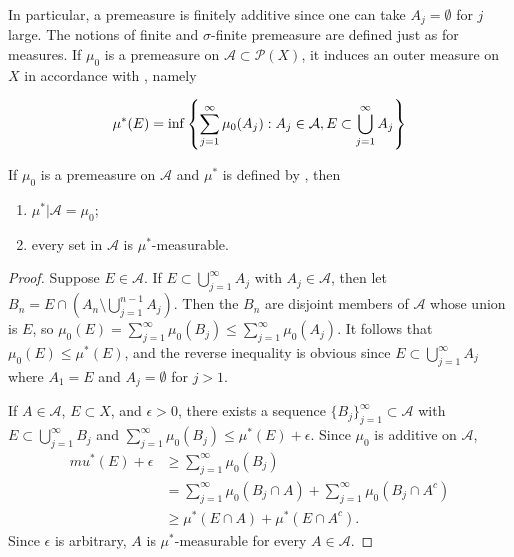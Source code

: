 In particular, a premeasure is finitely additive since one can take $A_j = \emptyset$ for $j$ large.
The notions of finite and $\sigma$-finite premeasure are defined just as for measures.
If $\mu_0$ is a premeasure on $\mathcal{A} \subset \mathcal{P}(X)$, it induces an outer measure on $X$ in accordance with , namely

\begin{align}
    \mu^*(E) = \inf \left\{ \sum_{j=1}^{\infty} \mu_0(A_j) : A_j \in \mathcal{A}, E \subset \bigcup_{j=1}^{\infty} A_j \right\} \labeq{premeasure_outer_measure}
\end{align}

\begin{proposition}
    If $\mu_0$ is a premeasure on $\mathcal{A}$ and $\mu^*$ is defined by , then
    \begin{enumerate}
        \item $\mu^*|\mathcal{A} = \mu_0$;
        \item every set in $\mathcal{A}$ is $\mu^*$-measurable.
    \end{enumerate}
\end{proposition}

\begin{proof}
    Suppose $E \in \mathcal{A}$. 
    If $E \subset \bigcup_{j=1}^{\infty} A_j$ with $A_j \in \mathcal{A}$, then let $B_n = E \cap (A_n \setminus \bigcup_{j=1}^{n-1} A_j)$.
    Then the $B_n$ are disjoint members of $\mathcal{A}$ whose union is $E$, so $\mu_0(E) = \sum_{j=1}^{\infty} \mu_0(B_j) \le \sum_{j=1}^{\infty} \mu_0(A_j)$.
    It follows that $\mu_0(E) \le \mu^*(E)$, and the reverse inequality is obvious since $E \subset \bigcup_{j=1}^{\infty} A_j$ where $A_1 = E$ and $A_j = \emptyset$ for $j > 1$.

    If $A \in \mathcal{A}$, $E \subset X$, and $\epsilon > 0$, there exists a sequence $\{ B_j \}_{j=1}^{\infty} \subset \mathcal{A}$ with $E \subset \bigcup_{j=1}^{\infty} B_j$ and $\sum_{j=1}^{\infty} \mu_0(B_j) \le \mu^*(E) + \epsilon$.
    Since $\mu_0$ is additive on $\mathcal{A}$,
    \begin{align}
        mu^*(E) + \epsilon &\ge \sum_{j=1}^{\infty} \mu_0(B_j) \\
        &= \sum_{j=1}^{\infty} \mu_0(B_j \cap A) + \sum_{j=1}^{\infty} \mu_0(B_j \cap A^c) \\
        &\ge \mu^*(E \cap A) + \mu^*(E \cap A^c).
    \end{align}
    Since $\epsilon$ is arbitrary, $A$ is $\mu^*$-measurable for every $A \in \mathcal{A}$.
\end{proof}

